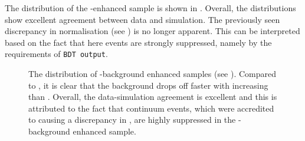 The \EB distribution of the \BB-enhanced sample is shown in .
Overall, the distributions show excellent agreement between data and simulation.
The previously seen discrepancy in normalisation (see ) is no longer apparent.
This can be interpreted based on the fact that here \epem\ra\qqbar events are strongly suppressed, namely 
by the requirements of \texttt{BDT~output}.
\begin{figure}[htbp!]
    \centering
    \caption{\label{fig:bbbar_enhanced_eb} The \EB distribution of \BB-background enhanced samples (see ).
    Compared to , it is clear that the \BB background drops off faster with increasing \EB than \epem\ra\qqbar.
    Overall, the data-simulation agreement is excellent and this is attributed to the fact that continuum events, which were accredited to causing a discrepancy in , are highly suppressed in the \BB-background enhanced sample.
    }
\end{figure}

